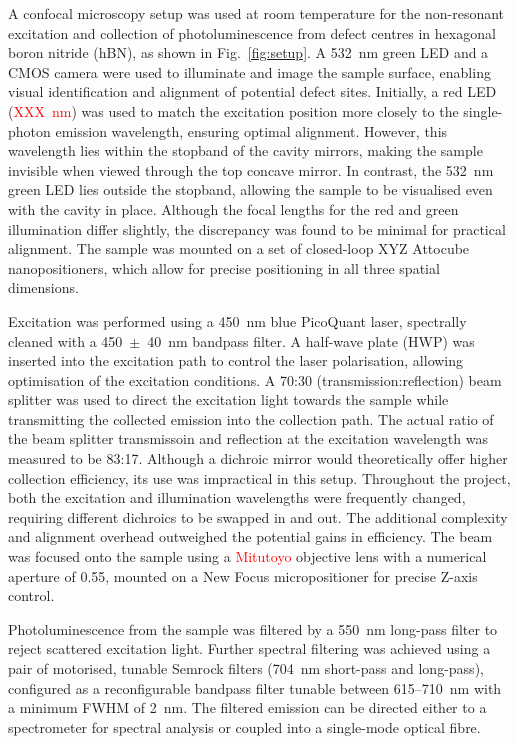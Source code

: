 A confocal microscopy setup was used at room temperature for the non-resonant excitation and collection of photoluminescence from defect centres in hexagonal boron nitride (hBN), as shown in Fig.~\ref{fig:setup}. A 532~nm green LED and a CMOS camera were used to illuminate and image the sample surface, enabling visual identification and alignment of potential defect sites. Initially, a red LED (\textcolor{red}{XXX~nm}) was used to match the excitation position more closely to the single-photon emission wavelength, ensuring optimal alignment. However, this wavelength lies within the stopband of the cavity mirrors, making the sample invisible when viewed through the top concave mirror. In contrast, the 532~nm green LED lies outside the stopband, allowing the sample to be visualised even with the cavity in place. Although the focal lengths for the red and green illumination differ slightly, the discrepancy was found to be minimal for practical alignment. The sample was mounted on a set of closed-loop XYZ Attocube nanopositioners, which allow for precise positioning in all three spatial dimensions.


Excitation was performed using a 450~nm blue PicoQuant laser, spectrally cleaned with a 450~$\pm$~40~nm bandpass filter. A half-wave plate (HWP) was inserted into the excitation path to control the laser polarisation, allowing optimisation of the excitation conditions. A 70:30 (transmission:reflection) beam splitter was used to direct the excitation light towards the sample while transmitting the collected emission into the collection path. The actual ratio of the beam splitter transmissoin and reflection at the excitation wavelength was measured to be 83:17. Although a dichroic mirror would theoretically offer higher collection efficiency, its use was impractical in this setup. Throughout the project, both the excitation and illumination wavelengths were frequently changed, requiring different dichroics to be swapped in and out. The additional complexity and alignment overhead outweighed the potential gains in efficiency. The beam was focused onto the sample using a \textcolor{red}{Mitutoyo} objective lens with a numerical aperture of 0.55, mounted on a New Focus micropositioner for precise Z-axis control.


Photoluminescence from the sample was filtered by a 550~nm long-pass filter to reject scattered excitation light. Further spectral filtering was achieved using a pair of motorised, tunable Semrock filters (704~nm short-pass and long-pass), configured as a reconfigurable bandpass filter tunable between 615--710~nm with a minimum FWHM of 2~nm. The filtered emission can be directed either to a spectrometer for spectral analysis or coupled into a single-mode optical fibre.

